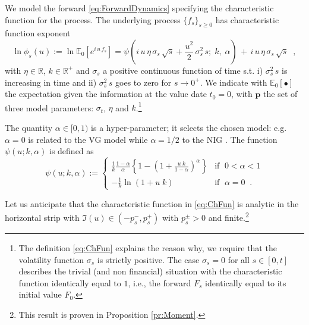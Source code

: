 \documentclass[12pt]{article}
\theoremstyle{definition}
\theoremstyle{remark}
\numberwithin{theorem}{section}
\numberwithin{proposition}{section}
\numberwithin{lemma}{section}
\numberwithin{corollary}{section}
\numberwithin{definition}{section}
\numberwithin{remark}{section}
\numberwithin{example}{section}
\newcommand{\R}{\mathbb{R}}
\begin{document}
\bigskip

We model the forward \eqref{eq:ForwardDynamics} specifying the characteristic function for the process.
The underlying process $\{ f_s \}_{s\ge 0}$ has characteristic function exponent
\begin{equation}
\label{eq:ChFun}
	\ln \phi_s(u):= \ln \mathbb{E}_0\left[e^{ i \, u \, f_s}\right]=\psi\left(i \, u \, \eta \,  {\sigma }_s \, \sqrt{ s}
+\frac{u^2 }{2} \, {\sigma }_s^2 \, s ; \; k, \; \alpha \right) \, + \,
 i\, u \, \eta \, {\sigma }_s \, \sqrt{ s}  \;\;,
\end{equation}
with $ \eta \in \R$, $k \in \R^+$ and ${\sigma }_s$ a positive continuous function of time s.t. i) ${\sigma }_s^2 \, s$ is increasing in time and ii) $\sigma_s^2\,s$ goes to zero for $s\rightarrow0^+$. 
We indicate with $\mathbb{E}_0[\bullet]$ the expectation given the information at the value date $t_0=0$, with $\mathbf{p}$ the set of three model parameters: $\sigma_t$, $\eta$ and $k$.\footnote{The definition \eqref{eq:ChFun} explains 
the reason why, 
we require that the volatility function $\sigma_s$ is strictly positive. 
The case $\sigma_s = 0$ for all $s\in[0,t]$ describes the trivial (and non financial) situation with the 
characteristic function identically equal to $1$, i.e., the forward  $F_s$ identically equal to its initial value $F_0$.}

The quantity $\alpha \in [0,1)$ is a hyper-parameter;
it selects the chosen model: e.g. $\alpha = 0$ is related to the VG model \citep{MadanSeneta1990} while $\alpha = 1/2$ to the NIG \citep{barndorff1997}.
The function $ \psi(u; k, \alpha)$ is defined as
\begin{equation}
\psi (u; k, \alpha) :=
\begin{cases} 
	\displaystyle \frac{1}{k}
	\displaystyle \frac{1-\alpha}{\alpha}
	\left \{1-		\left(1+\frac{u \; k}{1-\alpha}\right)^\alpha \right \} & \mbox{if } \; 0< \alpha < 1 \\[4mm]
	\displaystyle -\frac{1}{k}
	\ln \left(1+u \; k\right)  & \mbox{if } \; \alpha = 0\;\; .  \end{cases}
\label{eq:laplaceG}
\end{equation}

Let us anticipate that the characteristic function in \eqref{eq:ChFun} is analytic in the horizontal strip with $\Im(u)\in(-p_s^-,p_s^+)$ with $p_s^\pm>0$ and finite.\footnote{This result is proven in Proposition \ref{pr:Moment}.}
\bigskip
\end{document}
